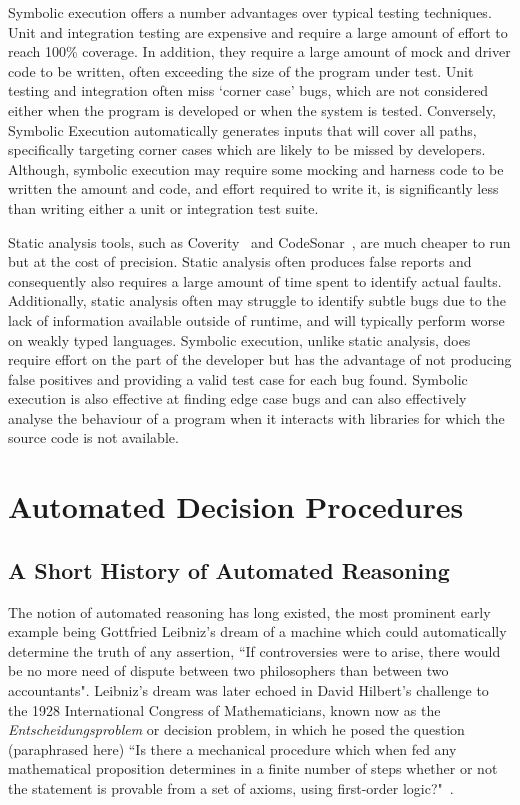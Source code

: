 \documentclass[]{final_report}
\begin{document}
Symbolic execution offers a number advantages over typical testing techniques. Unit and integration testing are expensive and require a large amount of effort to reach 100\% coverage. In addition, they require a large amount of mock and driver code to be written, often exceeding the size of the program under test. Unit testing and integration often miss `corner case' bugs, which are not considered either when the program is developed or when the system is tested. Conversely, Symbolic Execution automatically generates inputs that will cover all paths, specifically targeting corner cases which are likely to be missed by developers. Although, symbolic execution may require some mocking and harness code to be written the amount and code, and effort required to write it, is significantly less than writing either a unit or integration test suite.

Static analysis tools, such as Coverity~\cite{almossawi2006analysis,Bessey:2010:FBL:1646353.1646374} and CodeSonar~\cite{jetley2008static}, are much cheaper to run but at the cost of precision. Static analysis often produces false reports and consequently also requires a large amount of time spent to identify actual faults. Additionally, static analysis often may struggle to identify subtle bugs due to the lack of information available outside of runtime, and will typically perform worse on weakly typed languages. Symbolic execution, unlike static analysis, does require effort on the part of the developer but has the advantage of not producing false positives and providing a valid test case for each bug found. Symbolic execution is also effective at finding edge case bugs and can also effectively analyse the behaviour of a program when it interacts with libraries for which the source code is not available.

\chapter{Automated Decision Procedures}

\section{A Short History of Automated Reasoning}
The notion of automated reasoning has long existed, the most prominent early example being Gottfried Leibniz's dream of a machine which could automatically determine the truth of any assertion, ``If controversies were to arise, there would be no more need of dispute between two philosophers than between two accountants". Leibniz's dream was later echoed in David Hilbert's challenge to the 1928 International Congress of Mathematicians, known now as the \textit{Entscheidungsproblem} or decision problem, in which he posed the question (paraphrased here) ``Is there a mechanical procedure which when fed any mathematical proposition determines in a finite number of steps whether or not the statement is provable from a set of axioms, using first-order logic?"~\cite{smtwheredowegofromhere, automatedreasoningbooklet2004}.
\end{document}
